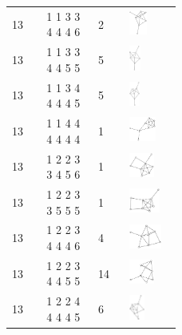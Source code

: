 \begin{footnotesize}
\begin{longtable}{m{0.07\linewidth} m{0.15\linewidth} m{0.05\linewidth} m{0.15\linewidth}}
13 & 1 1 3 3 4 4 4 6 & 2 & \includegraphics[height=0.8cm]{15-universal-graphs/img/degree-sequences-example-graphs/graph-4-8-34}\\
13 & 1 1 3 3 4 4 5 5 & 5 & \includegraphics[height=0.8cm]{15-universal-graphs/img/degree-sequences-example-graphs/graph-4-8-35}\\
13 & 1 1 3 4 4 4 4 5 & 5 & \includegraphics[height=0.8cm]{15-universal-graphs/img/degree-sequences-example-graphs/graph-4-8-36}\\
13 & 1 1 4 4 4 4 4 4 & 1 & \includegraphics[height=0.8cm]{15-universal-graphs/img/degree-sequences-example-graphs/graph-4-8-37}\\
13 & 1 2 2 3 3 4 5 6 & 1 & \includegraphics[height=0.8cm]{15-universal-graphs/img/degree-sequences-example-graphs/graph-4-8-38}\\
13 & 1 2 2 3 3 5 5 5 & 1 & \includegraphics[height=0.8cm]{15-universal-graphs/img/degree-sequences-example-graphs/graph-4-8-39}\\
13 & 1 2 2 3 4 4 4 6 & 4 & \includegraphics[height=0.8cm]{15-universal-graphs/img/degree-sequences-example-graphs/graph-4-8-40}\\
13 & 1 2 2 3 4 4 5 5 & 14 & \includegraphics[height=0.8cm]{15-universal-graphs/img/degree-sequences-example-graphs/graph-4-8-41}\\
13 & 1 2 2 4 4 4 4 5 & 6 & \includegraphics[height=0.8cm]{15-universal-graphs/img/degree-sequences-example-graphs/graph-4-8-42}\\

\end{longtable}
\end{footnotesize}

